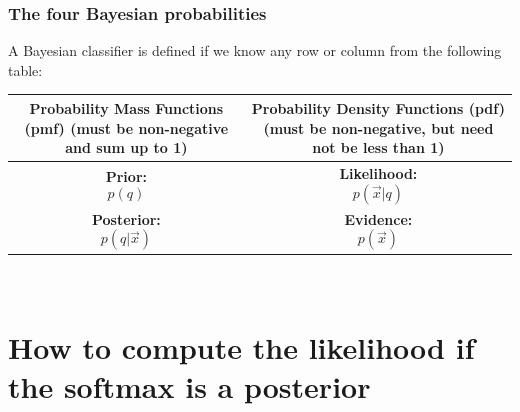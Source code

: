 \documentclass{beamer}
\begin{document}
\begin{frame}
  \frametitle{The four Bayesian probabilities}

  A Bayesian classifier is defined if we know any row or column from
  the following table:

  \begin{centering}
    \begin{tabular}{|c|c|}\hline
      \begin{minipage}{2in}
        Probability Mass Functions (pmf) (must be  non-negative and sum up to 1)
      \end{minipage} &
      \begin{minipage}{2in}
        Probability Density Functions (pdf) (must be non-negative, but need not be less than 1)
      \end{minipage} \\ \hline
      \begin{minipage}{2in}
        {\bf Prior:}
        $$p(q)$$
      \end{minipage} &
      \begin{minipage}{2in}
        {\bf Likelihood:}
        $$p(\vec{x}|q)$$
      \end{minipage} \\\hline
      \begin{minipage}{2in}
        {\bf Posterior:}
        $$p(q|\vec{x})$$
      \end{minipage} &
      \begin{minipage}{2in}
        {\bf Evidence:}
        $$p(\vec{x})$$
      \end{minipage} \\\hline
    \end{tabular}\\
  \end{centering}
\end{frame}

\section[Softmax as a Posterior]{How to compute the likelihood if the softmax is a posterior}
\setcounter{subsection}{1}
\end{document}
